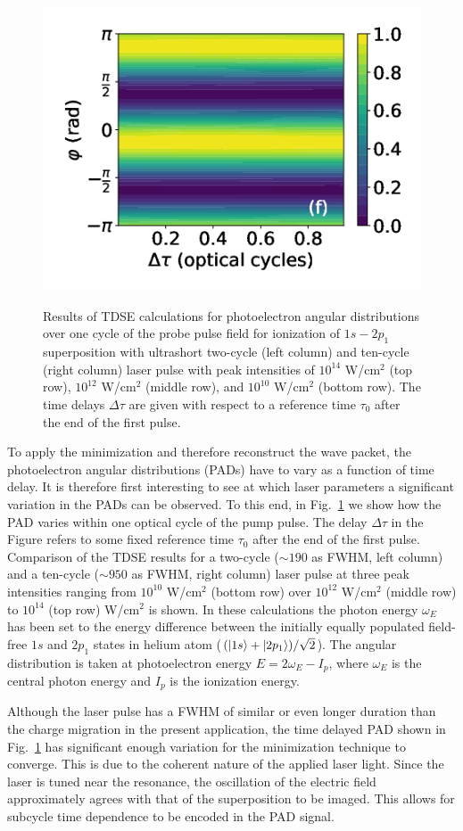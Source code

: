 \begin{figure}[!ht]
\includegraphics[width=0.4\linewidth]{figs/Photo_ionization/superpositions/Venzke_new_fig_2f.png}\\
\caption{
Results of TDSE calculations for photoelectron angular distributions over one cycle of the probe pulse field for ionization of $1s - 2p_1$ superposition with ultrashort two-cycle (left column) and ten-cycle (right column) laser pulse with peak intensities of $10^{14}$ W/cm$^2$ (top row), $10^{12}$ W/cm$^2$ (middle row), and $10^{10}$ W/cm$^2$ (bottom row). The time delays $\Delta \tau$ are given with respect to a reference time $\tau_0$ after the end of the first pulse.
} 
  \label{fig:pad_vs_time}
\end{figure}

To apply the minimization and therefore reconstruct the wave packet, the photoelectron angular distributions (PADs) have to vary as a function of time delay. It is therefore first interesting to see at which laser parameters a significant variation in the PADs can be observed. To this end,
in Fig.~\ref{fig:pad_vs_time} we show how the PAD varies within one optical cycle of the pump pulse.
The delay $\Delta \tau$ in the Figure refers to some fixed reference time $\tau_0$ after the end of the first pulse. Comparison of the TDSE results for a two-cycle ($\sim190$ as FWHM, left column) and a ten-cycle ($\sim950$ as FWHM, right column) laser pulse at three peak intensities ranging from $10^{10}$ W/cm$^2$ (bottom row) over $10^{12}$ W/cm$^2$ (middle row) to $10^{14}$ (top row) W/cm$^2$ is shown. In these calculations the photon energy $\omega_E$ has been set to the energy difference between the initially equally populated field-free $1s$ and $2p_1$ states in helium atom ($(\ket{1s}+\ket{2p_1})/\sqrt{2}$). The angular distribution is taken at photoelectron energy $E = 2\omega_E - I_p$, where $\omega_E$ is the central photon energy and $I_p$ is the ionization energy. 

Although the laser pulse has a FWHM of similar or even longer duration than the charge migration in the present application, the time delayed PAD shown in Fig.~\ref{fig:pad_vs_time} has significant enough variation for the minimization technique to converge. This is due to the coherent nature of the applied laser light. Since the laser is tuned near the resonance, the oscillation of the electric field approximately agrees with that of the superposition to be imaged. This allows for subcycle time dependence to be encoded in the PAD signal.

